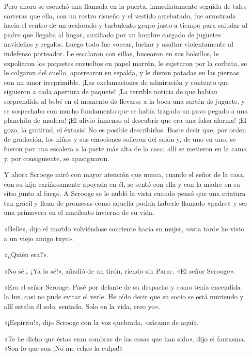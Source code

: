 \documentclass{novela}
\begin{document}
 Pero ahora se escuchó una llamada en la puerta, inmediatamente seguida de tales carreras que ella, con un rostro risueño y el vestido arrebatado, fue arrastrada hacia el centro de un acalorado y turbulento grupo justo a tiempo para saludar al padre que llegaba al hogar, auxiliado por un hombre cargado de juguetes navideños y regalos. Luego todo fue vocear, luchar y asaltar violentamente al indefenso porteador. Le escalaron con sillas, bucearon en sus bolsillos, le expoliaron los paquetes envueltos en papel marrón, le sujetaron por la corbata, se le colgaron del cuello, aporrearon su espalda, y le dieron patadas en las piernas con un amor irreprimible. ¡Las exclamaciones de admiración y contento que siguieron a cada apertura de paquete! ¡La terrible noticia de que habían sorprendido al bebé en el momento de llevarse a la boca una sartén de juguete, y se sospechaba con mucho fundamento que se había tragado un pavo pegado a una planchita de madera! ¡El alivio inmenso al descubrir que era una falsa alarma! ¡El gozo, la gratitud, el éxtasis! No es posible describirlos. Baste decir que, por orden de gradación, los niños y sus emociones salieron del salón y, de uno en uno, se fueron por una escalera a la parte más alta de la casa; allí se metieron en la cama y, por consiguiente, se apaciguaron.

 Y ahora Scrooge miró con mayor atención que nunca, cuando el señor de la casa, con su hija cariñosamente apoyada en él, se sentó con ella y con la madre en su sitio junto al fuego. A Scrooge se le nubló la vista cuando pensó que una criatura tan grácil y llena de promesas como aquella podría haberle llamado «padre» y ser una primavera en el macilento invierno de su vida.

 «Belle», dijo el marido volviéndose sonriente hacia su mujer, «esta tarde he visto a un viejo amigo tuyo».

 «¿Quién era?».

 «No sé{\ldots} ¡Ya lo sé!», añadió de un tirón, riendo sin Parar. «El señor Scrooge».

 «Era el señor Scrooge. Pasé por delante de su despacho y como tenía encendida la luz, casi no pude evitar el verle. He oído decir que su socio se está muriendo y allí estaba él solo, sentado. Solo en la vida, creo yo».

 «¡Espíritu!», dijo Scrooge con la voz quebrada, «sácame de aquí».

 «Te he dicho que éstas eran sombras de las cosas que han sido», dijo el fantasma. «Son lo que son ¡No me eches la culpa!»
\end{document}
